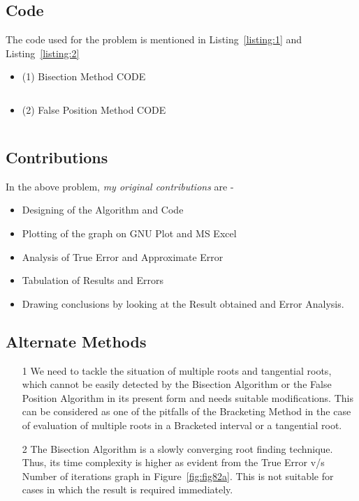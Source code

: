 \documentclass[titlepage, 11pt]{article}
\begin{document}

\subsection{Code}
The code used for the problem is mentioned in Listing~\ref{listing:1} and  Listing~\ref{listing:2}

\begin {itemize}
\item [(1)] Bisection Method CODE
\end {itemize}
\inputminted[breaklines,
 mathescape,
 linenos,
 numbersep=5pt,
 frame=single,
 numbersep=5pt,
 xleftmargin=0pt]{c}{Bisection1.c}
\label{listing:1}

\begin {itemize}
\item [(2)] False Position Method CODE
\end {itemize}
\inputminted[breaklines,
 mathescape,
 linenos,
 numbersep=5pt,
 frame=single,
 numbersep=5pt,
 xleftmargin=0pt]{c}{FalsePosition1.c}
\label{listing:2}


\subsection{Contributions}
In the above problem, \textit{my original contributions} are - 
\begin{itemize}
    \item Designing of the Algorithm and Code
    \item Plotting of the graph on GNU Plot and MS Excel
    \item Analysis of True Error and Approximate Error
    \item Tabulation of Results and Errors
    \item Drawing conclusions by looking at the Result obtained and Error Analysis.
\end{itemize}

\subsection{Alternate Methods}
\begin{itemize}
\item [1] We need to tackle the situation of multiple roots and tangential roots, which cannot be easily detected by the Bisection Algorithm or the False Position Algorithm in its present form and needs suitable modifications. This can be considered as one of the pitfalls of the Bracketing Method in the case of evaluation of multiple roots in a Bracketed interval or a tangential root. 
\item [2] The Bisection Algorithm is a slowly converging root finding technique. Thus, its time complexity is higher as evident from the True Error v/s Number of iterations graph in Figure~\ref{fig:fig82a}. This is not suitable for cases in which the result is required immediately. 
\end{itemize}
\newpage
\end{document}
